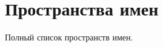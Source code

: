 \section{Пространства имен}
Полный список пространств имен.\begin{DoxyCompactList}
\item{}
\end{DoxyCompactList}
